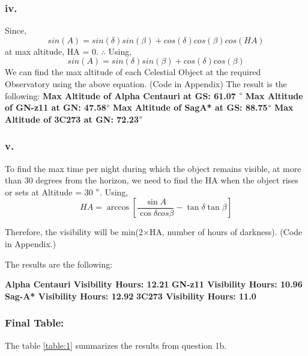 \documentclass{article}
\begin{document}
        \subsubsection*{iv.}
            Since, \[sin(A) = sin(\delta)sin(\beta) + cos(\delta)cos(\beta)cos(HA)\]
            at max altitude, HA = 0. $\therefore$ Using, \[sin(A) = sin(\delta)sin(\beta) + cos(\delta)cos(\beta)\]
            We can find the max altitude of each Celestial Object at the required Observatory using the above equation. (Code in Appendix)
            The result is the following:
            \textbf{Max Altitude of Alpha Centauri at GS:  61.07} $\degree$\newline
            \textbf{ Max Altitude of GN-z11 at GN:  47.58$\degree$}\newline
            \textbf{ Max Altitude of SagA* at GS:  88.75$\degree$}\newline
            \textbf{Max Altitude of 3C273 at GN:  72.23$\degree$}\newline
            
        \subsubsection*{v.}
        
        To find the max time per night during which the object remains visible, at more than 30 degrees from the horizon, we need to find the HA when the object rises or sets at Altitude = 30 $\degree$.
        Using,
        \[HA = \arccos[{\frac{\sin{A}}{\cos{\delta}cos{\beta}} - \tan{\delta}\tan{\beta}}]\]
        
        Therefore, the visibility will be min(2$\times$HA, number of hours of darkness). (Code in Appendix.)
        
        The results are the following:
        
        \textbf{Alpha Centauri Visibility Hours:  12.21}\newline
        \textbf{GN-z11 Visibility Hours:  10.96}\newline
        \textbf{Sag-A* Visibility Hours:  12.92}\newline
        \textbf{3C273 Visibility Hours:  11.0}\newline
        
    \subsubsection*{Final Table:}
        The table \ref{table:1} summarizes the results from question 1b.
        
\end{document}
